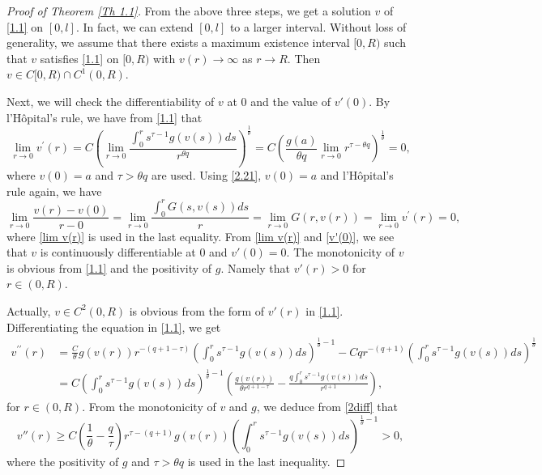 \documentclass[a4paper,11pt]{amsart}
\theoremstyle{plain}
\theoremstyle{remark}
\numberwithin{equation}{section}
\numberwithin{figure}{section}
\numberwithin{remark}{section}
\begin{document}
\begin{sloppypar}
\begin{proof}[Proof of Theorem \ref{Th 1.1}]
	\vspace{2mm}
	
	From the above three steps, we get a solution $v$ of \eqref{1.1} on $[0,l]$.
	In fact, we can extend $[0,l]$ to a larger interval. Without loss of generality, we assume that there exists a maximum existence interval $[0,R)$ such that $v$ satisfies \eqref{1.1} on $[0,R)$ with $v(r)\to \infty$ as $r\to R$. Then $v \in C[0, R)\cap C^1(0, R)$.
	
	\vspace{2mm}
	Next, we will check the differentiability of $v$ at $0$ and the value of $v'(0)$. By l'H\^opital's rule,  we have from \eqref{1.1} that
	\begin{equation}\label{lim v(r)}
			\lim_{r\to 0}v^{\prime}(r)
			=C \left( \lim_{r\to 0} \frac{\int_{0}^{r}s^{\tau-1}g(v(s)) ds}{r^{\theta q}}  \right) ^\frac{1}{\theta}
			=C \left( \frac{g(a)}{\theta q} \lim_{r\to 0} r^{\tau-\theta q} \right)^{\frac{1}{\theta}}=0,
	\end{equation}
	where $v(0)=a$ and $\tau>\theta q$ are used. Using \eqref{2.21}, $v(0)=a$ and l'H\^opital's rule again, we have
	\begin{equation}\label{v'(0)}
	\lim_{r\to 0} \frac{v(r) - v(0)}{r-0} = \lim_{r\to 0} \frac{\int_{0}^r G(s, v(s))ds}{r} = \lim_{r\to 0} G(r, v(r))= \lim_{r\to 0}v^{\prime}(r)=0,
	\end{equation}
	where \eqref{lim v(r)} is used in the last equality. From \eqref{lim v(r)} and \eqref{v'(0)}, we see that $v$ is continuously differentiable at $0$ and $v'(0)=0$. The monotonicity of $v$ is obvious from \eqref{1.1} and the positivity of $g$. Namely that $v'(r)>0$ for $r\in (0, R)$.
	
	Actually, $v\in C^2(0, R)$ is obvious from the form of $v'(r)$ in \eqref{1.1}.
	Differentiating the equation in \eqref{1.1}, we get
	\begin{equation}\label{2diff}
	\begin{aligned}
			v^{\prime\prime}(r)
			 &  =  \frac{C}{\theta} g(v(r)) r^{-(q+1-\tau)} \left ( \int_{0}^{r} s^{\tau-1} g (v(s))ds\right)^{\frac{1}{\theta}-1} 
			          -Cq r^{-(q+1)} \left ( \int_{0}^{r} s^{\tau-1} g (v(s))ds\right)^{\frac{1}{\theta}} \\
			 & = C \left ( \int_{0}^{r} s^{\tau-1} g (v(s))ds\right)^{\frac{1}{\theta}-1} \left ( \frac{g(v(r))}{\theta r^{q+1-\tau}} - \frac{q \int_{0}^{r} s^{\tau-1} g (v(s))ds}{r^{q+1}} \right ),
	\end{aligned}
	\end{equation}	
	for $r\in (0, R)$. From the monotonicity of $v$ and $g$, we deduce from \eqref{2diff} that
	\begin{equation}\label{convexity}
	v''(r) \ge C \left(\frac{1}{\theta}-\frac{q}{\tau}\right) r^{\tau - (q+1)} g(v(r)) \left ( \int_{0}^{r} s^{\tau-1} g (v(s))ds\right)^{\frac{1}{\theta}-1} >0,
	\end{equation}
	where the positivity of $g$ and $\tau > \theta q$ is used in the last inequality.	
	

\end{proof}
\end{sloppypar}
\end{document}
